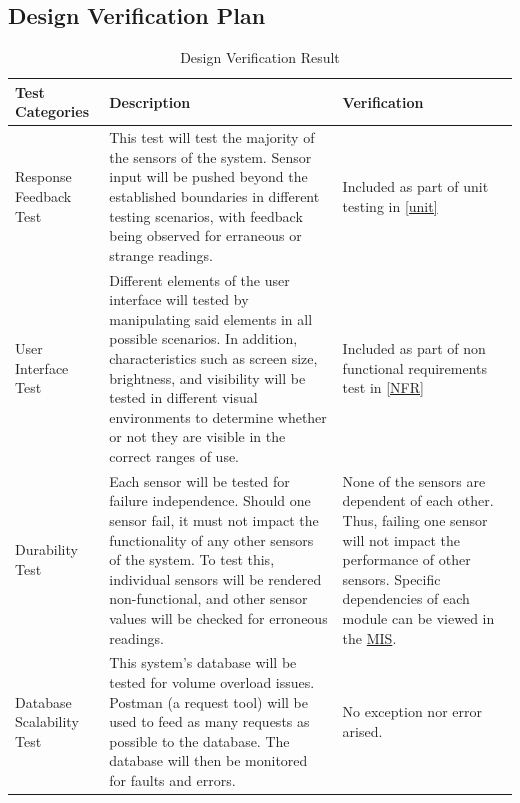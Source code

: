 \documentclass[12pt, titlepage]{article}
\begin{document}
\subsection{Design Verification Plan}
\begin{table} [H]
\caption{Design Verification Result}
\begin{tabular}{|p{2.75cm}|p{8cm}|p{4.75cm}|}
  \hline
\textbf{Test \newline Categories} & \textbf{Description}&\textbf{Verification}\\
 \hline
  Response \newline Feedback Test                  & This test will test the majority of the sensors of the system. Sensor input will be pushed beyond the established boundaries in different testing scenarios, with feedback being observed for erraneous or strange readings.
 & Included as part of unit testing in \ref{unit}\\
  \hline
  User \newline Interface Test                     & Different elements of the user interface will tested by manipulating said elements in all possible scenarios. In addition, characteristics such as screen size, brightness, and visibility will be tested in different visual environments to determine whether or not they are visible in the correct ranges of use.                                                                                                              & Included as part of non functional requirements test in \ref{NFR}             \\
  \hline
  Durability Test                         & Each sensor will be tested for failure independence. Should one sensor fail, it must not impact the functionality of any other sensors of the system. To test this, individual sensors will be rendered non-functional, and other sensor values will be checked for erroneous readings.                                                                         & None of the sensors are dependent of each other. Thus, failing one sensor will not impact the performance of other sensors. Specific dependencies of each module can be viewed in the \href{https://github.com/zakerl/Capstone_Project/blob/main/docs/Design/SoftDetailedDes/MIS.pdf}{MIS}.            \\
  \hline
  Database \newline Scalability Test               & This system's database will be tested for volume overload issues. Postman (a request tool) will be used to feed as many requests as possible to the database. The database will then be monitored for faults and errors. & No exception nor error arised.             \\

\end{tabular}
\end{table}
\end{document}
